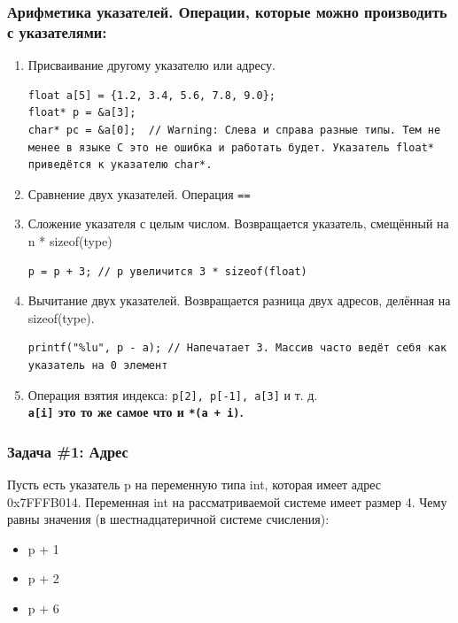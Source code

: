 \documentclass{article}
\begin{document}
\subsubsection*{Арифметика указателей. Операции, которые можно производить с указателями:}
\begin{enumerate}
\item Присваивание другому указателю или адресу.
\begin{lstlisting}
float a[5] = {1.2, 3.4, 5.6, 7.8, 9.0};
float* p = &a[3];
char* pc = &a[0];  // Warning: Слева и справа разные типы. Тем не менее в языке C это не ошибка и работать будет. Указатель float* приведётся к указателю char*.
\end{lstlisting}
\item Сравнение двух указателей. Операция \texttt{==}
\item Сложение указателя с целым числом. Возвращается указатель, смещённый на n * sizeof(type)
\begin{lstlisting}
p = p + 3; // p увеличится 3 * sizeof(float)
\end{lstlisting}
\item Вычитание двух указателей. Возвращается разница двух адресов, делённая на sizeof(type).
\begin{lstlisting}
printf("%lu", p - a); // Напечатает 3. Массив часто ведёт себя как указатель на 0 элемент 
\end{lstlisting}
\item Операция взятия индекса: \texttt{p[2], p[-1], a[3]} и т. д. \\
\textbf{\texttt{a[i]} это то же самое что и \texttt{*(a + i)}.}
\end{enumerate}

\subsubsection*{\Squarepipe \quad Задача \#1: Адрес}
Пусть есть указатель p на переменную типа int, которая имеет адрес 0x7FFFB014. Переменная int на рассматриваемой системе имеет размер 4. Чему равны значения (в шестнадцатеричной системе счисления):
\begin{multicols}{3}
\begin{itemize}
\item p + 1
\item p + 2
\item p + 6
\end{itemize}
\end{multicols}
\end{document}
